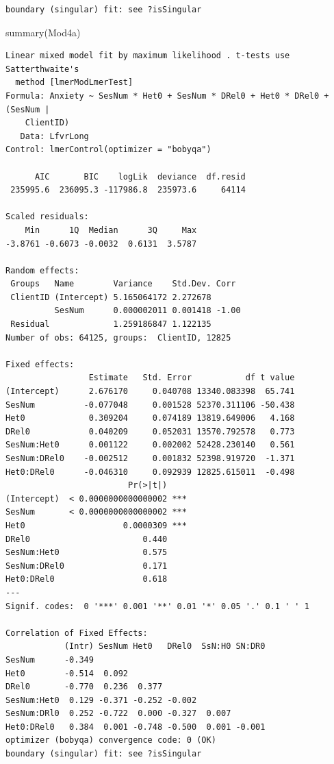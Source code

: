\documentclass[
  11pt,
]{book}
\newenvironment{Shaded}{\begin{snugshade}}{\end{snugshade}}
\newcommand{\FunctionTok}[1]{\textcolor[rgb]{0.00,0.00,0.00}{#1}}
\newcommand{\NormalTok}[1]{#1}
\begin{document}
\begin{verbatim}
boundary (singular) fit: see ?isSingular
\end{verbatim}

\begin{Shaded}
\begin{Highlighting}[]
\FunctionTok{summary}\NormalTok{(Mod4a)}
\end{Highlighting}
\end{Shaded}

\begin{verbatim}
Linear mixed model fit by maximum likelihood . t-tests use Satterthwaite's
  method [lmerModLmerTest]
Formula: Anxiety ~ SesNum * Het0 + SesNum * DRel0 + Het0 * DRel0 + (SesNum |  
    ClientID)
   Data: LfvrLong
Control: lmerControl(optimizer = "bobyqa")

      AIC       BIC    logLik  deviance  df.resid 
 235995.6  236095.3 -117986.8  235973.6     64114 

Scaled residuals: 
    Min      1Q  Median      3Q     Max 
-3.8761 -0.6073 -0.0032  0.6131  3.5787 

Random effects:
 Groups   Name        Variance    Std.Dev. Corr 
 ClientID (Intercept) 5.165064172 2.272678      
          SesNum      0.000002011 0.001418 -1.00
 Residual             1.259186847 1.122135      
Number of obs: 64125, groups:  ClientID, 12825

Fixed effects:
                 Estimate   Std. Error           df t value
(Intercept)      2.676170     0.040708 13340.083398  65.741
SesNum          -0.077048     0.001528 52370.311106 -50.438
Het0             0.309204     0.074189 13819.649006   4.168
DRel0            0.040209     0.052031 13570.792578   0.773
SesNum:Het0      0.001122     0.002002 52428.230140   0.561
SesNum:DRel0    -0.002512     0.001832 52398.919720  -1.371
Het0:DRel0      -0.046310     0.092939 12825.615011  -0.498
                         Pr(>|t|)    
(Intercept)  < 0.0000000000000002 ***
SesNum       < 0.0000000000000002 ***
Het0                    0.0000309 ***
DRel0                       0.440    
SesNum:Het0                 0.575    
SesNum:DRel0                0.171    
Het0:DRel0                  0.618    
---
Signif. codes:  0 '***' 0.001 '**' 0.01 '*' 0.05 '.' 0.1 ' ' 1

Correlation of Fixed Effects:
            (Intr) SesNum Het0   DRel0  SsN:H0 SN:DR0
SesNum      -0.349                                   
Het0        -0.514  0.092                            
DRel0       -0.770  0.236  0.377                     
SesNum:Het0  0.129 -0.371 -0.252 -0.002              
SesNum:DRl0  0.252 -0.722  0.000 -0.327  0.007       
Het0:DRel0   0.384  0.001 -0.748 -0.500  0.001 -0.001
optimizer (bobyqa) convergence code: 0 (OK)
boundary (singular) fit: see ?isSingular
\end{verbatim}
\end{document}
